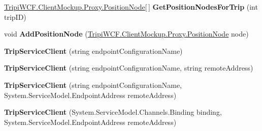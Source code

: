 \begin{DoxyCompactItemize}
\item 
\hypertarget{class_tripi_w_c_f_1_1_client_mockup_1_1_proxy_1_1_trip_service_client_a0568d2d0f9aabc3ffd752b7bb7be3a16}{
\hyperlink{class_tripi_w_c_f_1_1_client_mockup_1_1_proxy_1_1_position_node}{TripiWCF.ClientMockup.Proxy.PositionNode}\mbox{[}$\,$\mbox{]} {\bfseries GetPositionNodesForTrip} (int tripID)}
\label{class_tripi_w_c_f_1_1_client_mockup_1_1_proxy_1_1_trip_service_client_a0568d2d0f9aabc3ffd752b7bb7be3a16}

\item 
\hypertarget{class_tripi_w_c_f_1_1_client_mockup_1_1_proxy_1_1_trip_service_client_a8bd55e05ff2a32330f4a48d69357da15}{
void {\bfseries AddPositionNode} (\hyperlink{class_tripi_w_c_f_1_1_client_mockup_1_1_proxy_1_1_position_node}{TripiWCF.ClientMockup.Proxy.PositionNode} node)}
\label{class_tripi_w_c_f_1_1_client_mockup_1_1_proxy_1_1_trip_service_client_a8bd55e05ff2a32330f4a48d69357da15}

\item 
\hypertarget{class_tripi_w_c_f_1_1_client_mockup_1_1_proxy_1_1_trip_service_client_adf574734d8750881f921ee69cf9a5631}{
{\bfseries TripServiceClient} (string endpointConfigurationName)}
\label{class_tripi_w_c_f_1_1_client_mockup_1_1_proxy_1_1_trip_service_client_adf574734d8750881f921ee69cf9a5631}

\item 
\hypertarget{class_tripi_w_c_f_1_1_client_mockup_1_1_proxy_1_1_trip_service_client_a8df5f565af8eaa4ef0a483e5ec2c0a87}{
{\bfseries TripServiceClient} (string endpointConfigurationName, string remoteAddress)}
\label{class_tripi_w_c_f_1_1_client_mockup_1_1_proxy_1_1_trip_service_client_a8df5f565af8eaa4ef0a483e5ec2c0a87}

\item 
\hypertarget{class_tripi_w_c_f_1_1_client_mockup_1_1_proxy_1_1_trip_service_client_a3d73a69c2c051af7d07455ebd01c553b}{
{\bfseries TripServiceClient} (string endpointConfigurationName, System.ServiceModel.EndpointAddress remoteAddress)}
\label{class_tripi_w_c_f_1_1_client_mockup_1_1_proxy_1_1_trip_service_client_a3d73a69c2c051af7d07455ebd01c553b}

\item 
\hypertarget{class_tripi_w_c_f_1_1_client_mockup_1_1_proxy_1_1_trip_service_client_aba38c5b511e7194f2f1f062e61dee2ba}{
{\bfseries TripServiceClient} (System.ServiceModel.Channels.Binding binding, System.ServiceModel.EndpointAddress remoteAddress)}
\label{class_tripi_w_c_f_1_1_client_mockup_1_1_proxy_1_1_trip_service_client_aba38c5b511e7194f2f1f062e61dee2ba}


\end{DoxyCompactItemize}
